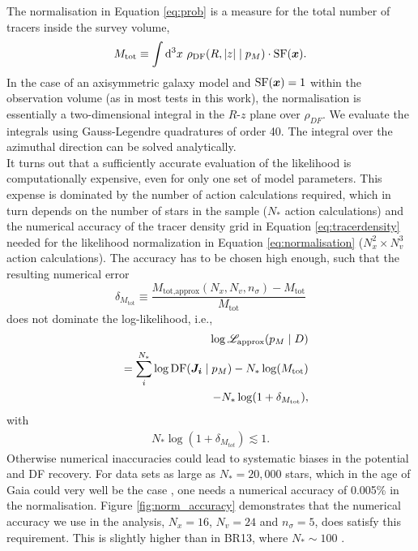 The normalisation in Equation \ref{eq:prob} is a measure for the total number of tracers inside the survey volume,
\begin{equation}
M_\text{tot} \equiv \int \mathop{}\!\mathrm{d^3} x \  \rho_\text{DF}(R,|z| \mid p_M) \cdot \text{SF}(\boldsymbol{x}).\label{eq:normalisation}
\end{equation}
In the case of an axisymmetric galaxy model and $\text{SF}(\boldsymbol{x})=1$ within the observation volume (as in most tests in this work), the normalisation is essentially a two-dimensional integral in the $R$-$z$ plane over $\rho_{DF}$. We evaluate the integrals using Gauss-Legendre quadratures of order 40. The integral over the azimuthal direction can be solved analytically. 
\\It turns out that a sufficiently accurate evaluation of the likelihood is computationally expensive, even for only one set of model parameters. This expense is dominated by the number of action calculations required, which in turn depends on the number of stars in the sample ($N_*$ action calculations) and the numerical accuracy of the tracer density grid in Equation \ref{eq:tracerdensity} needed for the likelihood normalization in Equation \ref{eq:normalisation} ($N_x^2 \times N_v^3$ action calculations). The accuracy has to be chosen high enough, such that the resulting numerical error 
\begin{equation}
\delta_{M_\text{tot}} \equiv \frac{M_\text{tot,approx}(N_x,N_v,n_\sigma) -  M_\text{tot} }{M_\text{tot}}\label{eq:relerrlikelihood}
\end{equation}
does not dominate the log-likelihood, i.e.,
\begin{eqnarray}
& &\log \mathscr{L}_\text{approx}(p_M \mid D) \nonumber\\
&& = \sum_i^{N_*} \log \text{DF}(\boldsymbol{J_i} \mid p_M) - N_* \log(M_\text{tot})\nonumber\\
&& - N_* \log (1 + \delta_{M_\text{tot}}),\label{eq:loglikelihood_relerr}
\end{eqnarray}
with
\begin{eqnarray}
N_* \log (1 + \delta_{M_{tot}}) \lesssim 1.\nonumber
\end{eqnarray}
Otherwise numerical inaccuracies could lead to systematic biases in the potential and DF recovery. For data sets as large as $N_* = 20,000$ stars, which in the age of Gaia could very well be the case \HW{[TO DO: Really???]}, one needs a numerical accuracy of 0.005\% in the normalisation. Figure \ref{fig:norm_accuracy} demonstrates that the numerical accuracy we use in the analysis, $N_x=16$, $N_v=24$ and $n_\sigma=5$, does satisfy this requirement. This is slightly higher than in BR13, where $N_* \sim 100$ \Wilma{[TO DO: CHECK]}.\\


